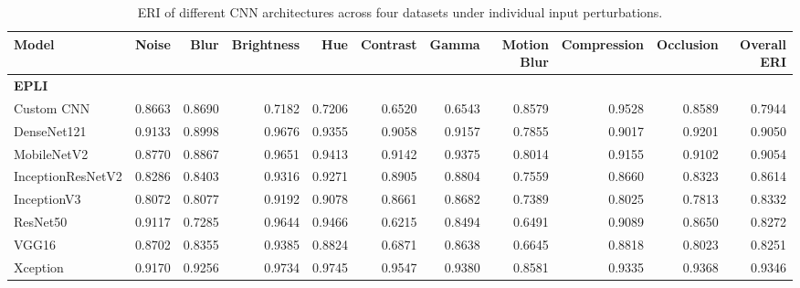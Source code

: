 \documentclass[a4paper,fleqn]{cas-dc}
\begin{document}
\begin{table}[t]
    \centering
    \caption{ERI of different CNN architectures across four datasets under individual input perturbations.}
    \label{tab:eri_perturbation_all}

    \scriptsize
    \setlength{\tabcolsep}{3pt}
    \renewcommand{\arraystretch}{1.1}

    \begin{tabular}{l *{10}{r}}
        \toprule
        \textbf{Model} &
        \textbf{Noise} & \textbf{Blur} & \textbf{Brightness} &
        \textbf{Hue} & \textbf{Contrast} & \textbf{Gamma} &
        \textbf{Motion Blur} & \textbf{Compression} &
        \textbf{Occlusion} & \textbf{Overall ERI} \\
        \midrule

        \multicolumn{11}{l}{\textbf{EPLI}} \\
        \midrule
        Custom CNN        & 0.8663 & 0.8690 & 0.7182 & 0.7206 & 0.6520 & 0.6543 & 0.8579 & 0.9528 & 0.8589 & 0.7944 \\
        DenseNet121       & 0.9133 & 0.8998 & 0.9676 & 0.9355 & 0.9058 & 0.9157 & 0.7855 & 0.9017 & 0.9201 & 0.9050 \\
        MobileNetV2       & 0.8770 & 0.8867 & 0.9651 & 0.9413 & 0.9142 & 0.9375 & 0.8014 & 0.9155 & 0.9102 & 0.9054 \\
        InceptionResNetV2 & 0.8286 & 0.8403 & 0.9316 & 0.9271 & 0.8905 & 0.8804 & 0.7559 & 0.8660 & 0.8323 & 0.8614 \\
        InceptionV3       & 0.8072 & 0.8077 & 0.9192 & 0.9078 & 0.8661 & 0.8682 & 0.7389 & 0.8025 & 0.7813 & 0.8332 \\
        ResNet50          & 0.9117 & 0.7285 & 0.9644 & 0.9466 & 0.6215 & 0.8494 & 0.6491 & 0.9089 & 0.8650 & 0.8272 \\
        VGG16             & 0.8702 & 0.8355 & 0.9385 & 0.8824 & 0.6871 & 0.8638 & 0.6645 & 0.8818 & 0.8023 & 0.8251 \\
        Xception          & 0.9170 & 0.9256 & 0.9734 & 0.9745 & 0.9547 & 0.9380 & 0.8581 & 0.9335 & 0.9368 & 0.9346 \\


\end{tabular}
\end{table}
\end{document}
